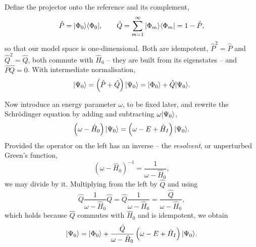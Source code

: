 Define the projector onto the reference and its complement,
\begin{equation}
  \hat{P} = \vert \Phi_0 \rangle\langle \Phi_0 \vert,
  \qquad
  \hat{Q} = \sum_{m=1}^{\infty}\vert \Phi_m \rangle\langle \Phi_m \vert
          = 1 - \hat{P},
  \label{eq:9-PQ}
\end{equation}
so that our model space is one-dimensional.  Both are idempotent,
$\hat{P}^2=\hat{P}$ and $\hat{Q}^2=\hat{Q}$, both commute with $\hat{H}_0$ --
they are built from its eigenstates -- and $\hat{P}\hat{Q}=0$.  With
intermediate normalisation,
\begin{equation}
  \vert \Psi_0 \rangle = \left(\hat{P}+\hat{Q}\right)\vert \Psi_0 \rangle
   = \vert \Phi_0 \rangle + \hat{Q}\vert \Psi_0 \rangle.
  \label{eq:9-PQdecomposition}
\end{equation}

Now introduce an energy parameter $\omega$, to be fixed later, and rewrite the
Schr\"odinger equation by adding and subtracting
$\omega\vert \Psi_0 \rangle$,
\begin{equation}
  \left(\omega-\hat{H}_0\right)\vert \Psi_0 \rangle
   = \left(\omega-E+\hat{H}_I\right)\vert \Psi_0 \rangle.
  \label{eq:9-omegaform}
\end{equation}
Provided the operator on the left has an inverse -- the \emph{resolvent}, or
unperturbed Green's function,
\begin{equation}
  \left(\omega-\hat{H}_0\right)^{-1}
   = \frac{1}{\omega-\hat{H}_0},
  \label{eq:9-resolvent}
\end{equation}
we may divide by it.  Multiplying from the left by $\hat{Q}$ and using
\begin{equation}
  \hat{Q}\frac{1}{\omega-\hat{H}_0}\hat{Q}
   = \hat{Q}\frac{1}{\omega-\hat{H}_0}
   = \frac{\hat{Q}}{\omega-\hat{H}_0},
  \label{eq:9-Qcommutes}
\end{equation}
which holds because $\hat{Q}$ commutes with $\hat{H}_0$ and is idempotent, we
obtain
\begin{equation}
  \vert \Psi_0 \rangle = \vert \Phi_0 \rangle
    + \frac{\hat{Q}}{\omega-\hat{H}_0}
      \left(\omega-E+\hat{H}_I\right)\vert \Psi_0 \rangle.
  \label{eq:9-implicit}
\end{equation}

